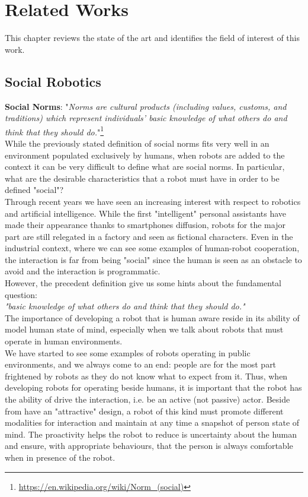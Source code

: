 \documentclass[pdftex,12pt,a4paper]{report}
\begin{document}
\chapter{Related Works}
This chapter reviews the state of the art and identifies the field of interest of this work.

\section{Social Robotics}
\textbf{Social Norms}: "\textit{Norms are cultural products (including values, customs, and traditions) which represent individuals' basic knowledge of what others do and think that they should do.}"\footnote{\url{https://en.wikipedia.org/wiki/Norm_(social)}}\\
\newline
\noindent While the previously stated definition of social norms fits very well in an environment populated exclusively by humans, when robots are added to the context it can be very difficult to define what are social norms. In particular, what are the desirable characteristics that a robot must have in order to be defined "social"?\\
\noindent Through recent years we have seen an increasing interest with respect to robotics and artificial intelligence. %
While the first "intelligent" personal assistants have made their appearance thanks to smartphones diffusion, robots for the major part are still relegated in a factory and seen as fictional characters.
Even in the industrial context, where we can see some examples of human-robot cooperation, the interaction is far from being "social" since the human is seen as an obstacle to avoid and the interaction is programmatic.\\
However, the precedent definition  give us some hints about the fundamental question:\\ 
\noindent\textit{"basic knowledge of what others do and think that they should do."}\\
The importance of developing a robot that is human aware reside in its ability of model human state of mind, especially when we talk about robots that must operate in human environments.\\
We have started to see some examples of robots operating in public environments, and we always come to an end: people are for the most part frightened by robots as they do not know what to expect from it.
Thus, when developing robots for operating beside humans, it is important that the robot has the ability of  drive the interaction, i.e. be an active (not passive) actor. Beside from have an "attractive" design, a robot of this kind must promote different modalities for interaction and maintain at any time a snapshot of person state of mind. The proactivity helps the robot to reduce is uncertainty about the human and ensure, with appropriate behaviours, that the person is always comfortable when in presence of the robot.
\end{document}
